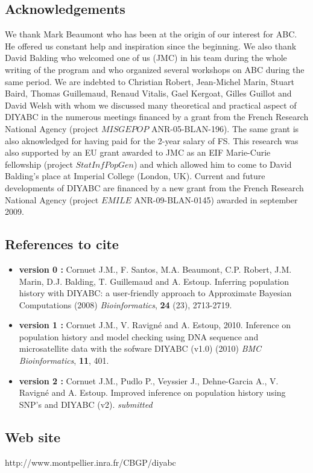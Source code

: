 \documentclass [a4paper]{report}
\let\subsectionv\subsection
\renewcommand{\subsection}[1]{\subsectionv{#1} \setcounter{paragraph}{0}}
\begin{document}
\subsection{Acknowledgements}
We thank Mark Beaumont who has been at the origin of our interest for ABC. He offered us constant help and inspiration since the beginning. We also thank David Balding who welcomed one of us (JMC) in his team during the whole writing of the program and who organized several workshops on ABC during the same period. We are indebted to Christian Robert, Jean-Michel Marin, Stuart Baird, Thomas Guillemaud, Renaud Vitalis, Gael Kergoat, Gilles Guillot and David Welsh with whom we discussed many theoretical and practical aspect of DIYABC in the numerous meetings financed by a grant from the French Research National Agency (project $MISGEPOP$ ANR-05-BLAN-196). The same grant is also aknowledged for having paid for the 2-year salary of FS. This research was also supported by an EU grant awarded to JMC as an EIF Marie-Curie fellowship (project $StatInfPopGen$) and which allowed him to come to David Balding's place at Imperial College (London, UK). Current and future developments of DIYABC are financed by a new grant from the French Research National Agency (project $EMILE$ ANR-09-BLAN-0145) awarded in september 2009.
\subsection{References to cite}
\begin{itemize}
\item \textbf{version 0 :} Cornuet J.M., F. Santos, M.A. Beaumont, C.P. Robert, J.M. Marin, D.J. Balding, T. Guillemaud and A. Estoup. Inferring population history with DIYABC: a user-friendly approach to Approximate Bayesian Computations (2008) \emph{Bioinformatics}, \textbf{24} (23), 2713-2719.
\item  \textbf{version 1 :}  Cornuet J.M., V. Ravign\'e and A. Estoup, 2010. Inference on population history and model checking using DNA sequence and microsatellite data with the sofware DIYABC (v1.0) (2010) \emph{BMC Bioinformatics}, \textbf{11}, 401.
\item  \textbf{version 2 :}  Cornuet J.M., Pudlo P., Veyssier J., Dehne-Garcia A., V. Ravign\'e and A. Estoup. Improved inference on population history using SNP's and DIYABC (v2). \emph{submitted}
\end{itemize}
\subsection{Web site}
http://www.montpellier.inra.fr/CBGP/diyabc\\



\newpage


%
%

\end{document}
